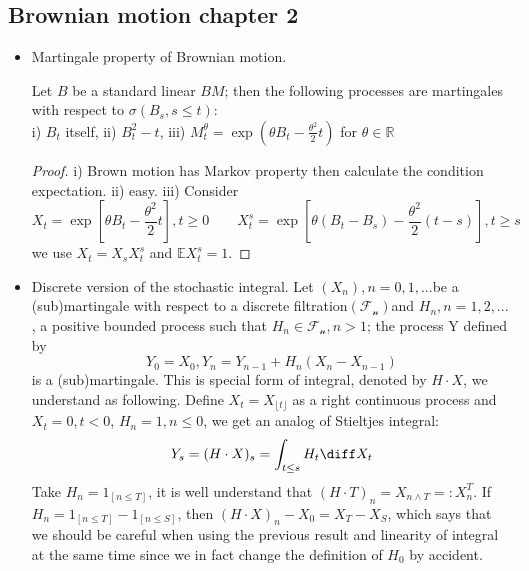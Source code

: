 \subsection{Brownian motion chapter 2}
\begin{itemize}
\item Martingale property of Brownian motion.
\begin{proposition}
	Let $ B $ be a standard linear $ BM $; then the following processes
	are martingales with respect to $ \sigma(B_{s}, s\leq t) $:\\
	i) $B_{t}$ itself, ii) $B_{t}^{2}-t$,  iii) $M_{t}^{\theta}=\exp \left(\theta B_{t}-\frac{\theta^{2}}{2} t\right)$ for $\theta \in \mathbb{R}$
\end{proposition}
\begin{proof}
	i) Brown motion has Markov property then calculate the condition expectation.
	ii) easy. 
	iii) Consider 	
	\[X_{t} = \exp \left[\theta B_{t}-\frac{\theta^{2}}{2} t\right],  t \geqslant 0 \qquad
	X_{t}^{s}=\exp \left[\theta\left(B_{t}-B_{s}\right)-\frac{\theta^{2}}{2}(t-s)\right], t \geqslant s \]
	 we use $ X_{t}=X_{s}X_{t}^{s}$ and $\mathbb{E} X_{t}^{s}=1$.
\end{proof}
\item Discrete version of the stochastic integral.
Let $ (X_{n}), n = 0, 1, ...  $be a (sub)martingale with respect to a
discrete filtration$  (\mathscr{F_{n}})  $and $ H_n , n = 1, 2, ...  $, a positive bounded process such that
$ H_n \in  \mathscr{F_{n}}, n > 1 $; the process Y defined by
\[ Y_{0}=X_{0}, Y_{n}=Y_{n-1}+H_{n}\left(X_{n}-X_{n-1}\right)\]
is a (sub)martingale. This is special form of integral, denoted by $ H\cdot X $, we understand as following.
Define $ X_t = X_{\lfloor t\rfloor} $ as a right continuous process and $ X_t = 0, t<0 $, $ H_n = 1, n \leq 0 $, we get an analog of Stieltjes integral:
\[ Y_s = (H \cdot X )_s=\int_{t \leq s} H_t \diff X_t \]
Take $ H_n = 1_{[n\leq T]} $, it is well understand that $( H\cdot T)_n =X_{n\wedge T} =: X^T_n $.
If  $ H_n = 1_{[n\leq T]}-1_{[n\leq S]} $, then
$(H \cdot X)_{n}-X_{0}=X_{T}-X_{S}$, which says that we should be careful when using the previous result and linearity of integral at the same time since we in fact change the definition of $ H_0 $ by accident.


\end{itemize}
